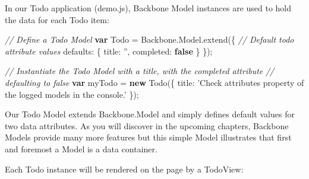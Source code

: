 \documentclass[9pt]{book}
\newenvironment{Shaded}{}{}
\newcommand{\KeywordTok}[1]{\textcolor[rgb]{0.00,0.44,0.13}{\textbf{{#1}}}}
\newcommand{\DataTypeTok}[1]{\textcolor[rgb]{0.56,0.13,0.00}{{#1}}}
\newcommand{\StringTok}[1]{\textcolor[rgb]{0.25,0.44,0.63}{{#1}}}
\newcommand{\CommentTok}[1]{\textcolor[rgb]{0.38,0.63,0.69}{\textit{{#1}}}}
\newcommand{\OtherTok}[1]{\textcolor[rgb]{0.00,0.44,0.13}{{#1}}}
\newcommand{\FunctionTok}[1]{\textcolor[rgb]{0.02,0.16,0.49}{{#1}}}
\newcommand{\NormalTok}[1]{{#1}}
\begin{document}
In our Todo application (demo.js), Backbone Model instances are used to
hold the data for each Todo item:

\begin{Shaded}
\begin{Highlighting}[]
\CommentTok{// Define a Todo Model}
\KeywordTok{var} \NormalTok{Todo = }\OtherTok{Backbone}\NormalTok{.}\OtherTok{Model}\NormalTok{.}\FunctionTok{extend}\NormalTok{(\{}
  \CommentTok{// Default todo attribute values}
  \DataTypeTok{defaults}\NormalTok{: \{}
    \DataTypeTok{title}\NormalTok{: }\StringTok{''}\NormalTok{,}
    \DataTypeTok{completed}\NormalTok{: }\KeywordTok{false}
  \NormalTok{\}}
\NormalTok{\});}

\CommentTok{// Instantiate the Todo Model with a title, with the completed attribute}
\CommentTok{// defaulting to false}
\KeywordTok{var} \NormalTok{myTodo = }\KeywordTok{new} \FunctionTok{Todo}\NormalTok{(\{}
  \DataTypeTok{title}\NormalTok{: }\StringTok{'Check attributes property of the logged models in the console.'}
\NormalTok{\});}
\end{Highlighting}
\end{Shaded}

Our Todo Model extends Backbone.Model and simply defines default values
for two data attributes. As you will discover in the upcoming chapters,
Backbone Models provide many more features but this simple Model
illustrates that first and foremost a Model is a data container.

Each Todo instance will be rendered on the page by a TodoView:
\end{document}
